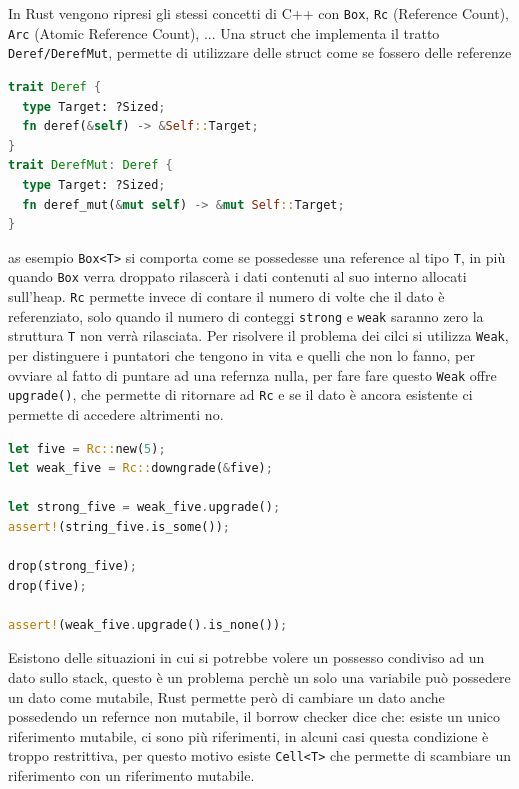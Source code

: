\documentclass[12pt]{article}
\begin{document}
In Rust vengono ripresi gli stessi concetti di C++ con \texttt{Box}, \texttt{Rc} (Reference Count), \texttt{Arc} (Atomic Reference Count), ... Una struct che implementa il tratto \texttt{Deref/DerefMut}, permette di utilizzare delle struct come se fossero delle referenze
\begin{lstlisting}[language=rust]
trait Deref {
  type Target: ?Sized;
  fn deref(&self) -> &Self::Target;
}
trait DerefMut: Deref {
  type Target: ?Sized;
  fn deref_mut(&mut self) -> &mut Self::Target;
}
\end{lstlisting}
as esempio \texttt{Box<T>} si comporta come se possedesse una reference al tipo \texttt{T}, in pi\`u quando \texttt{Box} verra droppato rilascer\`a i dati contenuti al suo interno allocati sull'heap. \texttt{Rc} permette invece di contare il numero di volte che il dato \`e referenziato, solo quando il numero di conteggi \texttt{strong} e \texttt{weak} saranno zero la struttura \texttt{T} non verr\`a rilasciata. Per risolvere il problema dei cilci si utilizza \texttt{Weak}, per distinguere i puntatori che tengono in vita e quelli che non lo fanno, per ovviare al fatto di puntare ad una refernza nulla, per fare fare questo \texttt{Weak} offre \texttt{upgrade()}, che permette di ritornare ad \texttt{Rc} e se il dato \`e ancora esistente ci permette di accedere altrimenti no.
\begin{lstlisting}[language=rust]
let five = Rc::new(5);
let weak_five = Rc::downgrade(&five);

let strong_five = weak_five.upgrade();
assert!(string_five.is_some());

drop(strong_five);
drop(five);

assert!(weak_five.upgrade().is_none());
\end{lstlisting}
Esistono delle situazioni in cui si potrebbe volere un possesso condiviso ad un dato sullo stack, questo \`e un problema perch\`e un solo una variabile pu\`o possedere un dato come mutabile, Rust permette per\`o di cambiare un dato anche possedendo un refernce non mutabile, il borrow checker dice che: esiste un unico riferimento mutabile, ci sono pi\`u riferimenti, in alcuni casi questa condizione \`e troppo restrittiva, per questo motivo esiste \texttt{Cell<T>} che permette di scambiare un riferimento con un riferimento mutabile.
\end{document}
